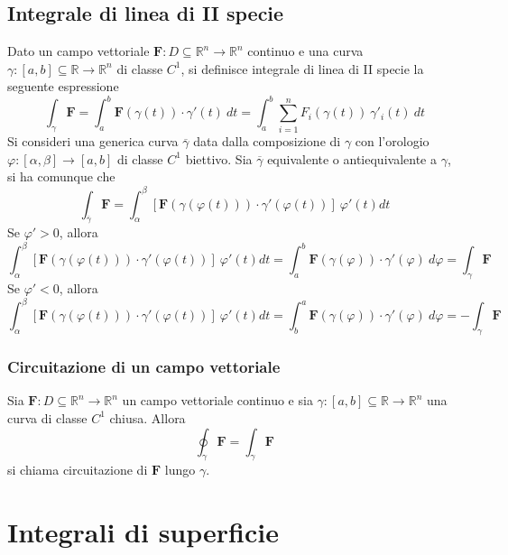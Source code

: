     \subsection{Integrale di linea di II specie}
        Dato un campo vettoriale $\mathbf{F}: D \subseteq \mathbb{R}^{n} \rightarrow \mathbb{R}^{n}$ continuo e una curva $\gamma: [a, b] \subseteq \mathbb{R} \rightarrow \mathbb{R}^{n}$ di classe $C^{1}$, si definisce integrale di linea di II specie la seguente espressione
        \[
            \int_{\gamma} \mathbf{F} = \int_{a}^{b} \mathbf{F}(\gamma(t)) \cdot \gamma'(t) \: dt = \int_{a}^{b} \sum_{i = 1}^{n} F_{i}(\gamma(t)) \: \gamma'_{i}(t) \: dt
        \]
        Si consideri una generica curva $\overline{\gamma}$ data dalla composizione di $\gamma$ con l'orologio $\varphi: [\alpha, \beta] \rightarrow [a, b]$ di classe $C^{1}$ biettivo.
        Sia $\overline{\gamma}$ equivalente o antiequivalente a $\gamma$, si ha comunque che
        \[
            \int_{\overline{\gamma}} \mathbf{F} = \int_{\alpha}^{\beta} \left[ \mathbf{F}(\gamma(\varphi(t))) \cdot \gamma'(\varphi(t)) \right]\: \varphi'(t) dt
        \]
        Se $\varphi' > 0$, allora
        \[
            \int_{\alpha}^{\beta} \left[ \mathbf{F}(\gamma(\varphi(t))) \cdot \gamma'(\varphi(t)) \right]\: \varphi'(t) dt = \int_{a}^{b} \mathbf{F}(\gamma(\varphi)) \cdot \gamma'(\varphi) \: d\varphi = \int_{\gamma} \mathbf{F}
        \]
        Se $\varphi' < 0$, allora
        \[
            \int_{\alpha}^{\beta} \left[ \mathbf{F}(\gamma(\varphi(t))) \cdot \gamma'(\varphi(t)) \right]\: \varphi'(t) dt = \int_{b}^{a} \mathbf{F}(\gamma(\varphi)) \cdot \gamma'(\varphi) \: d\varphi = -\int_{\gamma} \mathbf{F}
        \]

        \subsubsection{Circuitazione di un campo vettoriale}
            Sia $\mathbf{F}: D \subseteq \mathbb{R}^{n} \rightarrow \mathbb{R}^{n}$ un campo vettoriale continuo e sia $\gamma: [a, b] \subseteq \mathbb{R} \rightarrow \mathbb{R}^{n}$ una curva di classe $C^{1}$ chiusa.
            Allora
            \[
                \oint_{\gamma} \mathbf{F} = \int_{\gamma} \mathbf{F}
            \]
            si chiama circuitazione di $\mathbf{F}$ lungo $\gamma$.


\section{Integrali di superficie}
